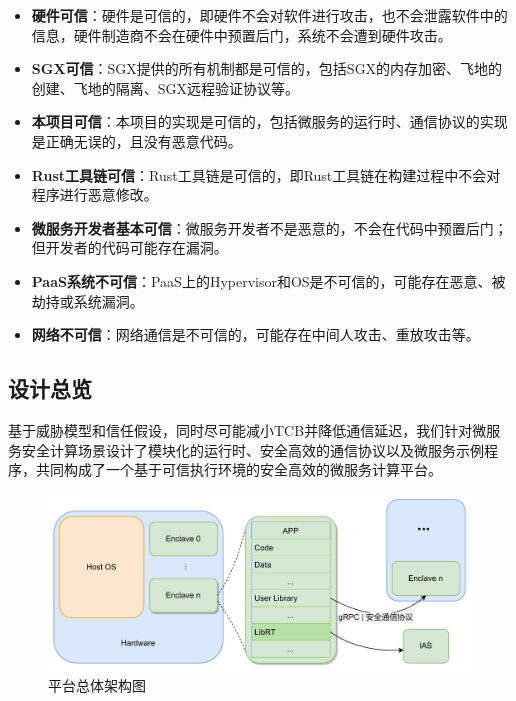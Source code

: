\begin{itemize}
    \item \textbf{硬件可信}：硬件是可信的，即硬件不会对软件进行攻击，也不会泄露软件中的信息，硬件制造商不会在硬件中预置后门，系统不会遭到硬件攻击。
    \item \textbf{SGX可信}：SGX提供的所有机制都是可信的，包括SGX的内存加密、飞地的创建、飞地的隔离、SGX远程验证协议等。
    \item \textbf{本项目可信}：本项目的实现是可信的，包括微服务的运行时、通信协议的实现是正确无误的，且没有恶意代码。
    \item \textbf{Rust工具链可信}：Rust工具链是可信的，即Rust工具链在构建过程中不会对程序进行恶意修改。
    \item \textbf{微服务开发者基本可信}：微服务开发者不是恶意的，不会在代码中预置后门；但开发者的代码可能存在漏洞。%
    \item \textbf{PaaS系统不可信}：PaaS上的Hypervisor和OS是不可信的，可能存在恶意、被劫持或系统漏洞。
    \item \textbf{网络不可信}：网络通信是不可信的，可能存在中间人攻击、重放攻击等。
\end{itemize}

\subsection{设计总览}

基于威胁模型和信任假设，同时尽可能减小TCB并降低通信延迟，我们针对微服务安全计算场景设计了模块化的运行时、安全高效的通信协议以及微服务示例程序，共同构成了一个基于可信执行环境的安全高效的微服务计算平台。

\begin{figure}[!ht]
    \centering
    \includegraphics[width=.8\textwidth]{figures/architecture.pdf}
    \caption{平台总体架构图}
    \label{fig:architecture}
\end{figure}

